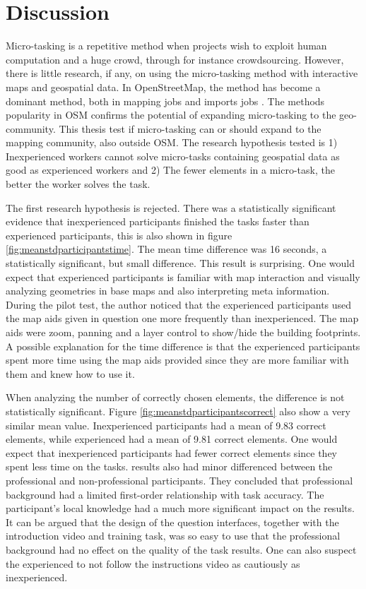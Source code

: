 \chapter{Discussion}
Micro-tasking is a repetitive method when projects wish to exploit human computation and a huge crowd, through for instance crowdsourcing. However, there is little research, if any, on using the micro-tasking method with interactive maps and geospatial data. In OpenStreetMap, the method has become a dominant method, both in mapping jobs and imports jobs \citep{Erichsen2016}. The methods popularity in OSM confirms the potential of expanding micro-tasking to the geo-community. This thesis test if micro-tasking can or should expand to the mapping community, also outside OSM. The research hypothesis tested is 1) Inexperienced workers cannot solve micro-tasks containing geospatial data as good as experienced workers and 2) The fewer elements in a micro-task, the better the worker solves the task.  

The first research hypothesis is rejected. There was a statistically significant evidence that inexperienced participants finished the tasks faster than experienced participants, this is also shown in figure \ref{fig:meanstdparticipantstime}. The mean time difference was 16 seconds, a statistically significant, but small difference. This result is surprising. One would expect that experienced participants is familiar with map interaction and visually analyzing geometries in base maps and also interpreting meta information. During the pilot test, the author noticed that the experienced participants used the map aids given in question one more frequently than inexperienced. The map aids were zoom, panning and a layer control to show/hide the building footprints. A possible explanation for the time difference is that the experienced participants spent more time using the map aids provided since they are more familiar with them and knew how to use it. 

When analyzing the number of correctly chosen elements, the difference is not statistically significant. Figure \ref{fig:meanstdparticipantscorrect} also show a very similar mean value. Inexperienced participants had a mean of 9.83 correct elements, while experienced had a mean of 9.81 correct elements. One would expect that inexperienced participants had fewer correct elements since they spent less time on the tasks. \cite{Salk2016} results also had minor differenced between the professional and non-professional participants. They concluded that professional background had a limited first-order relationship with task accuracy. The participant's local knowledge had a much more significant impact on the results. It can be argued that the design of the question interfaces, together with the introduction video and training task, was so easy to use that the professional background had no effect on the quality of the task results. One can also suspect the experienced to not follow the instructions video as cautiously as inexperienced. 

